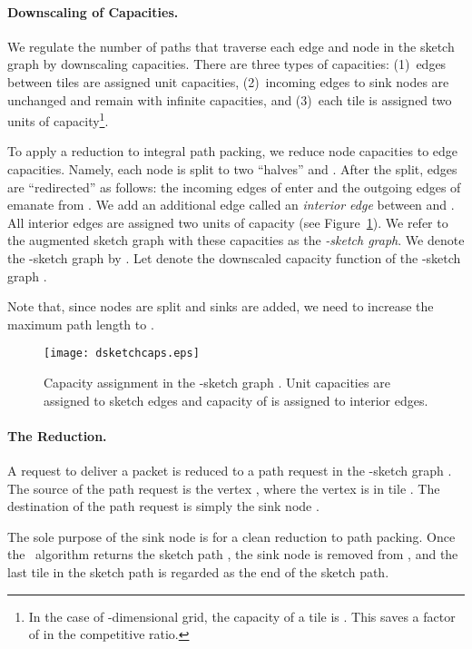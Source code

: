 \documentclass[11pt]{article}
\newcommand{\route}{\text{\sc{ipp}}}
\newcommand{\IPP}{\route}
\newenvironment{proof sketch}[1]{\noindent {\emph{Proof sketch of #1:}}}{\hfill \qed}
\begin{document}
\paragraph{Downscaling of Capacities.}
We regulate the number of paths that traverse each edge and node in the sketch graph
by downscaling capacities.  There are three types of capacities: (1)~edges between
tiles are assigned unit capacities, (2)~incoming edges to sink nodes are unchanged
and remain with infinite capacities, and (3)~each tile is assigned two units of
capacity\footnote{In the case of -dimensional grid, the capacity of a tile is
  . This saves a factor of  in the competitive ratio.}.

To apply a reduction to integral path packing, we reduce node capacities to edge
capacities. Namely, each node  is split to two ``halves''  and
. After the split, edges are ``redirected'' as follows: the incoming edges
of  enter  and the outgoing edges of  emanate from . We add an
additional edge called an \emph{interior edge} between  and .  All
interior edges are assigned two units of capacity (see Figure~\ref{fig:dsketchcaps}).  We refer to the augmented sketch
graph with these capacities as the \emph{-sketch graph}. We denote
the -sketch graph by .
Let  denote the downscaled capacity function of the -sketch graph .

Note that, since nodes are split and sinks are added, we need to increase the maximum path length to .

\begin{figure}[h]
  \centering
\texttt{[image: dsketchcaps.eps]}
\caption{
Capacity assignment in the -sketch graph . Unit capacities are assigned to sketch edges and capacity of  is assigned to interior edges.}
\label{fig:dsketchcaps}
\end{figure}

\paragraph{The Reduction.}
A request  to deliver a packet is reduced to a path request  in the -sketch graph . The source of the path request  is the vertex  , where the vertex  is in tile . The destination of the path request is simply the sink node .


The sole purpose of the sink node is for a clean reduction to path packing. Once the \IPP\ algorithm returns the sketch path , the sink node is removed from , and the last tile in the sketch path is regarded as the end of the sketch path.
\end{document}
